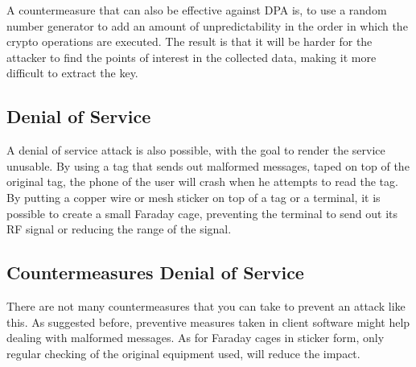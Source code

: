 A countermeasure that can also be effective against DPA is, to use a random number generator to add an amount of unpredictability in the order in which the crypto operations are executed.
The result is that it will be harder for the attacker to find the points of interest in the collected data, making it more difficult to extract the key. \cite{kocher2009differential}


\subsection{Denial of Service}
A denial of service attack is also possible, with the goal to render the service unusable. By using a tag that sends out malformed messages, taped on top of the original tag, the phone of the user will crash when he attempts to read the tag.
By putting a copper wire or mesh sticker on top of a tag or a terminal, it is possible to create a small Faraday cage, preventing the terminal to send out its RF signal or reducing the range of the signal. \cite{rieback2006your}

\subsection{Countermeasures Denial of Service}
There are not many countermeasures that you can take to prevent an attack like this. As suggested before, preventive measures taken in client software might help dealing with malformed messages. 
As for Faraday cages in sticker form, only regular checking of the original equipment used, will reduce the impact.

